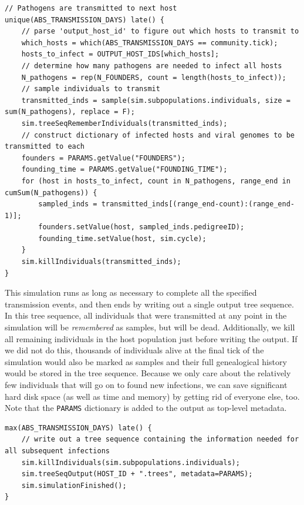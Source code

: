 \documentclass[12pt]{article}
\begin{document}
\begin{lstlisting}[language=slim, style=slimstyle, breaklines=true]
// Pathogens are transmitted to next host
unique(ABS_TRANSMISSION_DAYS) late() {
	// parse 'output_host_id' to figure out which hosts to transmit to
	which_hosts = which(ABS_TRANSMISSION_DAYS == community.tick);
	hosts_to_infect = OUTPUT_HOST_IDS[which_hosts];
	// determine how many pathogens are needed to infect all hosts
	N_pathogens = rep(N_FOUNDERS, count = length(hosts_to_infect));
	// sample individuals to transmit
	transmitted_inds = sample(sim.subpopulations.individuals, size = sum(N_pathogens), replace = F);
	sim.treeSeqRememberIndividuals(transmitted_inds);
	// construct dictionary of infected hosts and viral genomes to be transmitted to each
	founders = PARAMS.getValue("FOUNDERS");
	founding_time = PARAMS.getValue("FOUNDING_TIME");
	for (host in hosts_to_infect, count in N_pathogens, range_end in cumSum(N_pathogens)) {
		sampled_inds = transmitted_inds[(range_end-count):(range_end-1)];
		founders.setValue(host, sampled_inds.pedigreeID);
		founding_time.setValue(host, sim.cycle);
	}
    sim.killIndividuals(transmitted_inds);
}
\end{lstlisting}

This simulation runs as long as necessary to complete all the specified transmission events, and then ends by writing out a single output tree sequence. In this tree sequence, all
individuals that were transmitted at any point in the simulation will be \textit{remembered} as samples, but will be dead. Additionally, we kill all remaining individuals in the host population
just before writing the output. If we did not do this, thousands of individuals alive at the final tick of the simulation would also be marked as samples and their full genealogical history
would be stored in the tree sequence. Because we only care about the relatively few individuals that will go on to found new infections, we can save significant hard disk space
(as well as time and memory) by getting rid of everyone else, too. Note that the \verb|PARAMS| dictionary is added to the output as top-level metadata.

\begin{lstlisting}[language=slim, style=slimstyle, breaklines=true]
max(ABS_TRANSMISSION_DAYS) late() {
	// write out a tree sequence containing the information needed for all subsequent infections
	sim.killIndividuals(sim.subpopulations.individuals);
	sim.treeSeqOutput(HOST_ID + ".trees", metadata=PARAMS);
	sim.simulationFinished();
}
\end{lstlisting}
\end{document}
